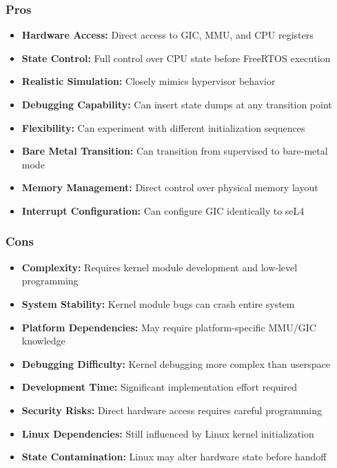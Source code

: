 \documentclass[11pt,a4paper]{article}
\begin{document}
\subsubsection{Pros}
\begin{itemize}
    \item \textbf{Hardware Access:} Direct access to GIC, MMU, and CPU registers
    \item \textbf{State Control:} Full control over CPU state before FreeRTOS execution
    \item \textbf{Realistic Simulation:} Closely mimics hypervisor behavior
    \item \textbf{Debugging Capability:} Can insert state dumps at any transition point
    \item \textbf{Flexibility:} Can experiment with different initialization sequences
    \item \textbf{Bare Metal Transition:} Can transition from supervised to bare-metal mode
    \item \textbf{Memory Management:} Direct control over physical memory layout
    \item \textbf{Interrupt Configuration:} Can configure GIC identically to seL4
\end{itemize}

\subsubsection{Cons}
\begin{itemize}
    \item \textbf{Complexity:} Requires kernel module development and low-level programming
    \item \textbf{System Stability:} Kernel module bugs can crash entire system
    \item \textbf{Platform Dependencies:} May require platform-specific MMU/GIC knowledge
    \item \textbf{Debugging Difficulty:} Kernel debugging more complex than userspace
    \item \textbf{Development Time:} Significant implementation effort required
    \item \textbf{Security Risks:} Direct hardware access requires careful programming
    \item \textbf{Linux Dependencies:} Still influenced by Linux kernel initialization
    \item \textbf{State Contamination:} Linux may alter hardware state before handoff
\end{itemize}
\end{document}
